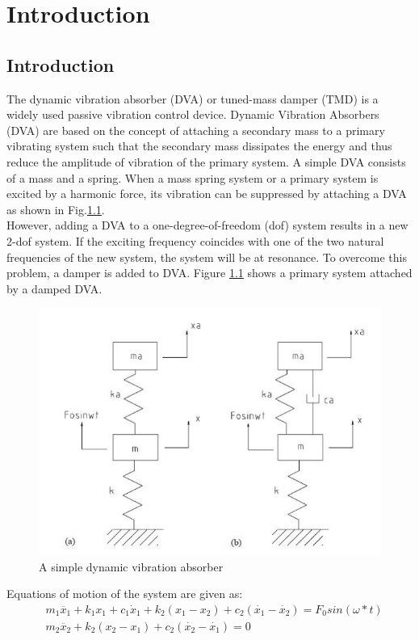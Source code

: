 %
\chapter{Introduction}
\section{Introduction}
The dynamic vibration absorber (DVA) or tuned-mass damper (TMD) is a widely used passive vibration control device. Dynamic Vibration Absorbers (DVA) are based on the concept of attaching a secondary mass to a primary vibrating system such that the secondary mass dissipates the energy and thus reduce the amplitude of vibration of the primary system. A simple DVA consists of a mass and a spring. When a mass spring system or a primary system is excited by a harmonic force, its vibration can be suppressed by attaching a DVA as shown in Fig.\ref{dva}.\\
However, adding a DVA to a one-degree-of-freedom (dof) system results in a new 2-dof system. If the exciting frequency coincides with one of the two natural frequencies of the new system, the system will be at resonance. To overcome this problem, a damper is added to DVA. Figure \ref{dva} shows a primary system attached by a damped DVA.

\begin{figure}[h]
\centering
\includegraphics[scale=0.4]{"figures/dva"}
\caption{A simple dynamic vibration absorber}
\label{dva}
\end{figure}
Equations of motion of the system are given as:
\begin{align}
&m_1\ddot{x_1}+k_1x_1+c_1 \dot x_1 +k_2(x_1-x_2)+c_2(\dot{x_1}-\dot{x_2})=F_0sin(\omega *t) \\
&m_2\ddot{x_2}+k_2(x_2-x_1)+c_{2}(\dot{x_{2}}-\dot{x_{1}})=0
\end{align}

